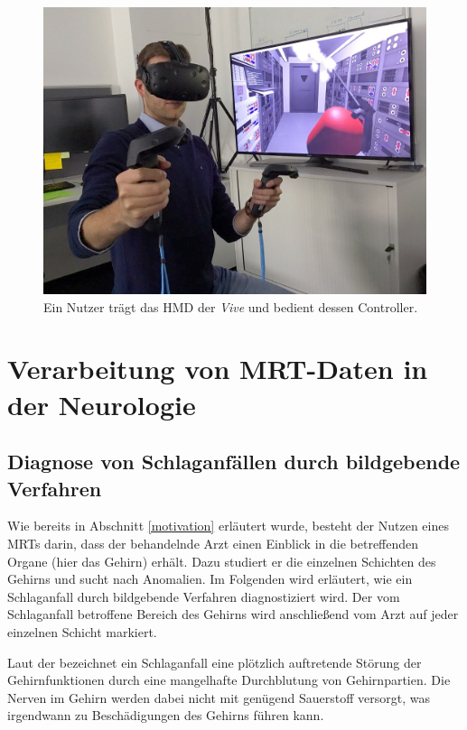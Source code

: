 \begin{figure}[!htb]
	\centering
	\includegraphics[width=0.5\linewidth]{images/vive.jpg}
	\caption{Ein Nutzer trägt das HMD der \textit{Vive} und bedient dessen Controller.}
	\label{img:vive}
\end{figure}
\FloatBarrier

\section{Verarbeitung von MRT-Daten in der Neurologie}						 %
 
\subsection{Diagnose von Schlaganf\"allen durch bildgebende Verfahren}
\label{schalganfaelleMRT}

Wie bereits in Abschnitt \ref{motivation} erläutert wurde, besteht der Nutzen eines MRTs darin, dass der behandelnde Arzt einen Einblick in die betreffenden Organe (hier das Gehirn) erhält. Dazu studiert er die einzelnen Schichten des Gehirns und sucht nach Anomalien.
Im Folgenden wird erläutert, wie ein Schlaganfall durch bildgebende Verfahren diagnostiziert wird.
Der vom Schlaganfall betroffene Bereich des Gehirns wird anschließend vom Arzt auf jeder einzelnen Schicht markiert.

Laut der \cite{schlaganfall} bezeichnet ein Schlaganfall eine plötzlich auftretende Störung der Gehirnfunktionen durch eine mangelhafte Durchblutung von Gehirnpartien. Die Nerven im Gehirn werden dabei nicht mit genügend Sauerstoff versorgt, was irgendwann zu Beschädigungen des Gehirns führen kann.

